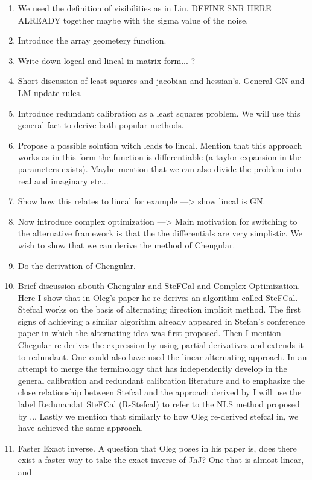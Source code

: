 \documentclass[useAMS,usenatbib]{mn2e}
\begin{document}
 \begin{enumerate}
 \item We need the definition of visibilities as in Liu. DEFINE SNR HERE ALREADY together maybe with the sigma value of the noise.
 \item Introduce the array geometery function.
 \item Write down logcal and lincal in matrix form... ?
 \item Short discussion of least squares and jacobian and hessian's. General GN and LM update rules.
 \item Introduce redundant calibration as a least squares problem. We will use this general fact to derive both popular methods.
 \item Propose a possible solution witch leads to lincal. Mention that this approach works as in this form the function is differentiable (a taylor expansion in the 
 parameters exists). Maybe mention that we can also divide the problem into real and imaginary etc...
 \item Show how this relates to lincal for example ---> show lincal is GN.
 \item Now introduce complex optimization ---> Main motivation for switching to the alternative framework is that the the differentials are very simplistic. We wish to show that
 we can derive the method of Chengular.
 \item Do the derivation of Chengular. 
 \item Brief discussion abouth Chengular and SteFCal and Complex Optimization. Here I show that in Oleg's paper he re-derives an algorithm called SteFCal. Stefcal works
 on the basis of alternating direction implicit method. The first signs of achieving a similar algorithm already appeared in Stefan's conference paper in which the alternating
 idea was first proposed. Then I mention Chegular re-derives the expression by using partial derivatives and extends it to redundant. One could also have used the linear alternating
 approach. In an attempt to merge the terminology that has independently develop in the general calibration and redundant calibration literature and to emphasize the close
 relationship between Stefcal and the approach derived by I will use the label Redunandat SteFCal (R-Stefcal) to refer to the NLS method proposed by ... Lastly we mention that similarly
 to how Oleg re-derived stefcal in, we have achieved the same approach.
 \item Faster Exact inverse. A question that Oleg poses in his paper is, does there exist a faster way to take the exact inverse of JhJ? One that is almost linear, and

\end{enumerate}
\end{document}

